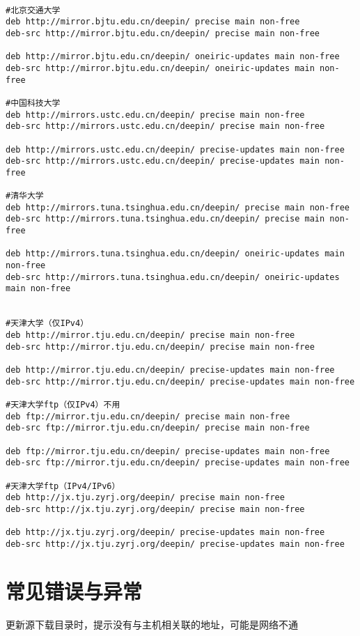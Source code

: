 \begin{verbatim}

#北京交通大学
deb http://mirror.bjtu.edu.cn/deepin/ precise main non-free
deb-src http://mirror.bjtu.edu.cn/deepin/ precise main non-free

deb http://mirror.bjtu.edu.cn/deepin/ oneiric-updates main non-free
deb-src http://mirror.bjtu.edu.cn/deepin/ oneiric-updates main non-free

#中国科技大学
deb http://mirrors.ustc.edu.cn/deepin/ precise main non-free
deb-src http://mirrors.ustc.edu.cn/deepin/ precise main non-free

deb http://mirrors.ustc.edu.cn/deepin/ precise-updates main non-free
deb-src http://mirrors.ustc.edu.cn/deepin/ precise-updates main non-free

#清华大学
deb http://mirrors.tuna.tsinghua.edu.cn/deepin/ precise main non-free
deb-src http://mirrors.tuna.tsinghua.edu.cn/deepin/ precise main non-free

deb http://mirrors.tuna.tsinghua.edu.cn/deepin/ oneiric-updates main non-free
deb-src http://mirrors.tuna.tsinghua.edu.cn/deepin/ oneiric-updates main non-free


#天津大学（仅IPv4）
deb http://mirror.tju.edu.cn/deepin/ precise main non-free
deb-src http://mirror.tju.edu.cn/deepin/ precise main non-free

deb http://mirror.tju.edu.cn/deepin/ precise-updates main non-free
deb-src http://mirror.tju.edu.cn/deepin/ precise-updates main non-free

#天津大学ftp（仅IPv4）不用
deb ftp://mirror.tju.edu.cn/deepin/ precise main non-free
deb-src ftp://mirror.tju.edu.cn/deepin/ precise main non-free

deb ftp://mirror.tju.edu.cn/deepin/ precise-updates main non-free
deb-src ftp://mirror.tju.edu.cn/deepin/ precise-updates main non-free

#天津大学ftp（IPv4/IPv6）
deb http://jx.tju.zyrj.org/deepin/ precise main non-free
deb-src http://jx.tju.zyrj.org/deepin/ precise main non-free

deb http://jx.tju.zyrj.org/deepin/ precise-updates main non-free
deb-src http://jx.tju.zyrj.org/deepin/ precise-updates main non-free
\end{verbatim}


\section{常见错误与异常}
更新源下载目录时，提示没有与主机相关联的地址，可能是网络不通

